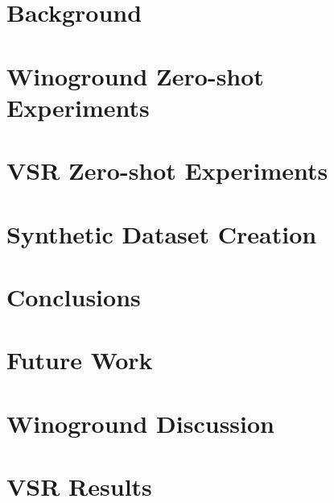\documentclass[a4paper, 11pt]{memoir}
\begin{document}
\chapter{Background} \label{cha:background}

\cleardoublepage

\chapter{Winoground Zero-shot Experiments} \label{cha:winoground_zero_shot}

\cleardoublepage

\chapter{VSR Zero-shot Experiments} \label{cha:vsr_zero_shot}

\cleardoublepage

\chapter{Synthetic Dataset Creation} \label{cha:synthetic_dataset}

\cleardoublepage

\chapter{Conclusions} \label{cha:conclusions}

\cleardoublepage

\chapter{Future Work} \label{cha:future_work}

\cleardoublepage


\appendix

\chapter{Winoground Discussion} \label{cha:appendix_winoground}


\chapter{VSR Results} \label{cha:appendix_vsr}




\end{document}
